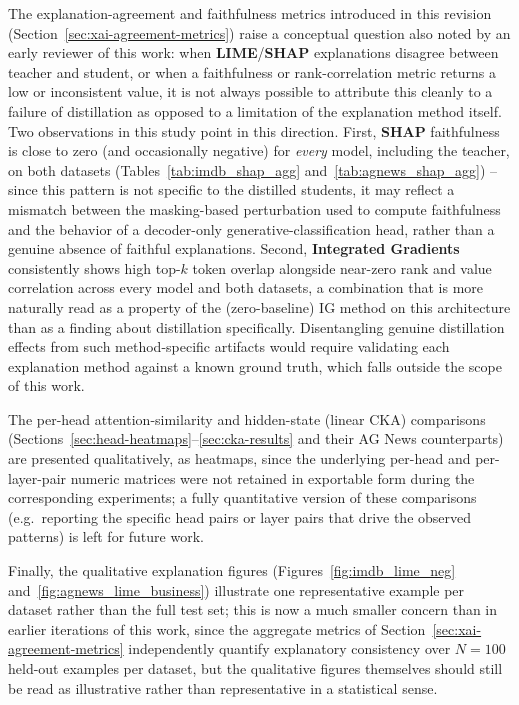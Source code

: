 \documentclass[conference]{IEEEtran}
\begin{document}
The explanation-agreement and faithfulness metrics introduced in this revision (Section~\ref{sec:xai-agreement-metrics}) raise a conceptual question also noted by an early reviewer of this work: when \textbf{LIME}/\textbf{SHAP} explanations disagree between teacher and student, or when a faithfulness or rank-correlation metric returns a low or inconsistent value, it is not always possible to attribute this cleanly to a failure of distillation as opposed to a limitation of the explanation method itself. Two observations in this study point in this direction. First, \textbf{SHAP} faithfulness is close to zero (and occasionally negative) for \emph{every} model, including the teacher, on both datasets (Tables~\ref{tab:imdb_shap_agg} and~\ref{tab:agnews_shap_agg}) -- since this pattern is not specific to the distilled students, it may reflect a mismatch between the masking-based perturbation used to compute faithfulness and the behavior of a decoder-only generative-classification head, rather than a genuine absence of faithful explanations. Second, \textbf{Integrated Gradients} consistently shows high top-$k$ token overlap alongside near-zero rank and value correlation across every model and both datasets, a combination that is more naturally read as a property of the (zero-baseline) IG method on this architecture than as a finding about distillation specifically. Disentangling genuine distillation effects from such method-specific artifacts would require validating each explanation method against a known ground truth, which falls outside the scope of this work.

The per-head attention-similarity and hidden-state (linear CKA) comparisons (Sections~\ref{sec:head-heatmaps}--\ref{sec:cka-results} and their AG News counterparts) are presented qualitatively, as heatmaps, since the underlying per-head and per-layer-pair numeric matrices were not retained in exportable form during the corresponding experiments; a fully quantitative version of these comparisons (e.g.\ reporting the specific head pairs or layer pairs that drive the observed patterns) is left for future work.

Finally, the qualitative explanation figures (Figures~\ref{fig:imdb_lime_neg} and~\ref{fig:agnews_lime_business}) illustrate one representative example per dataset rather than the full test set; this is now a much smaller concern than in earlier iterations of this work, since the aggregate metrics of Section~\ref{sec:xai-agreement-metrics} independently quantify explanatory consistency over $N=100$ held-out examples per dataset, but the qualitative figures themselves should still be read as illustrative rather than representative in a statistical sense.
\end{document}

